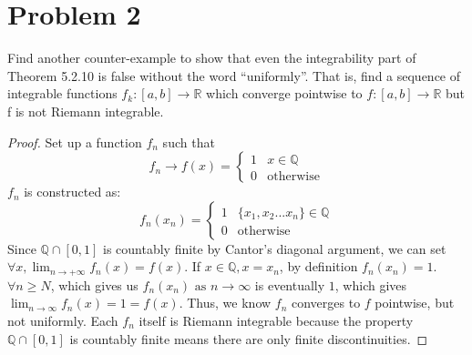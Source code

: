 \documentclass{article}
\begin{document}
\clearpage %
\section*{Problem 2}
Find another counter-example to show that even the integrability part of Theorem 5.2.10 is false without the word “uniformly”. That is, find a sequence of integrable functions $f_k : [a, b] \rightarrow \mathbb{R}$ which converge pointwise to $f : [a, b] \rightarrow \mathbb{R}$ but f is not Riemann integrable. 
\begin{proof}
Set up a function $f_n$ such that
$$
f_n \rightarrow f(x) = 
\begin{cases}
    1 &  x \in \mathbb{Q}\\
    0 & \text{otherwise}
\end{cases}
$$
$f_n$ is constructed as:
$$
f_n(x_n)= 
\begin{cases}
    1 &  \{ x_1, x_2...x_n\} \in \mathbb{Q}\\
    0 & \text{otherwise}
\end{cases}
$$
Since $\mathbb{Q} \cap [0, 1]$ is countably finite by Cantor's diagonal argument, we can set $\forall x, \lim_{n \rightarrow + \infty}f_n(x) = f(x)$. If $x \in \mathbb{Q}, x = x_n$, by definition $f_n(x_n) = 1$.  $\forall n \geq N$, which gives us $f_n(x_n) \text{ as } n \rightarrow \infty $ is eventually $1$, which gives $\lim_{n \rightarrow \infty} f_n(x) = 1 = f(x).$ Thus, we know $f_n$ converges to $f$ pointwise, but not uniformly. Each $f_n$ itself is Riemann integrable because the property $\mathbb{Q} \cap [0, 1]$ is countably finite means there are only finite discontinuities. 

\end{proof}
\clearpage
\end{document}
